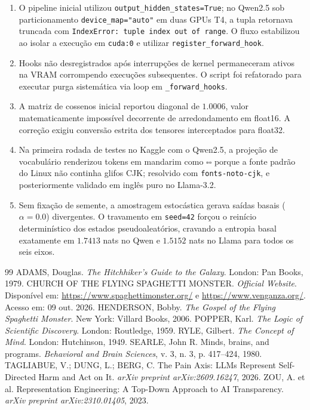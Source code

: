 \documentclass[11pt,a4paper]{article}
\begin{document}
\begin{enumerate}\small
    \item O pipeline inicial utilizou \texttt{output\_hidden\_states=True}; no Qwen2.5 sob particionamento \texttt{device\_map="auto"} em duas GPUs T4, a tupla retornava truncada com \texttt{IndexError: tuple index out of range}. O fluxo estabilizou ao isolar a execução em \texttt{cuda:0} e utilizar \texttt{register\_forward\_hook}.
    \item Hooks não desregistrados após interrupções de kernel permaneceram ativos na VRAM corrompendo execuções subsequentes. O script foi refatorado para executar purga sistemática via loop em \texttt{\_forward\_hooks}.
    \item A matriz de cossenos inicial reportou diagonal de $1.0006$, valor matematicamente impossível decorrente de arredondamento em float16. A correção exigiu conversão estrita dos tensores interceptados para float32.
    \item Na primeira rodada de testes no Kaggle com o Qwen2.5, a projeção de vocabulário renderizou tokens em mandarim como $\square\square$ porque a fonte padrão do Linux não continha glifos CJK; resolvido com \texttt{fonts-noto-cjk}, e posteriormente validado em inglês puro no Llama-3.2.
    \item Sem fixação de semente, a amostragem estocástica gerava saídas basais ($\alpha = 0.0$) divergentes. O travamento em \texttt{seed=42} forçou o reinício determinístico dos estados pseudoaleatórios, cravando a entropia basal exatamente em $1.7413$ nats no Qwen e $1.5152$ nats no Llama para todos os seis eixos.
\end{enumerate}

\begin{thebibliography}{99}\small
{} ADAMS, Douglas. \textit{The Hitchhiker's Guide to the Galaxy}. London: Pan Books, 1979.
 CHURCH OF THE FLYING SPAGHETTI MONSTER. \textit{Official Website}. Disponível em: \url{https://www.spaghettimonster.org/} e \url{https://www.venganza.org/}. Acesso em: 09 out. 2026.
 HENDERSON, Bobby. \textit{The Gospel of the Flying Spaghetti Monster}. New York: Villard Books, 2006.
 POPPER, Karl. \textit{The Logic of Scientific Discovery}. London: Routledge, 1959.
 RYLE, Gilbert. \textit{The Concept of Mind}. London: Hutchinson, 1949.
 SEARLE, John R. Minds, brains, and programs. \textit{Behavioral and Brain Sciences}, v. 3, n. 3, p. 417--424, 1980.
 TAGLIABUE, V.; DUNG, L.; BERG, C. The Pain Axis: LLMs Represent Self-Directed Harm and Act on It. \textit{arXiv preprint arXiv:2609.16247}, 2026.
 ZOU, A. et al. Representation Engineering: A Top-Down Approach to AI Transparency. \textit{arXiv preprint arXiv:2310.01405}, 2023.
\end{thebibliography}
\end{document}
